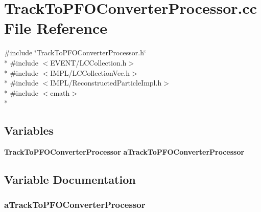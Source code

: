 \section{Track\-To\-P\-F\-O\-Converter\-Processor.\-cc File Reference}
\label{TrackToPFOConverterProcessor_8cc}
{\ttfamily \#include \char`\"{}Track\-To\-P\-F\-O\-Converter\-Processor.\-h\char`\"{}}\\*
{\ttfamily \#include $<$E\-V\-E\-N\-T/\-L\-C\-Collection.\-h$>$}\\*
{\ttfamily \#include $<$I\-M\-P\-L/\-L\-C\-Collection\-Vec.\-h$>$}\\*
{\ttfamily \#include $<$I\-M\-P\-L/\-Reconstructed\-Particle\-Impl.\-h$>$}\\*
{\ttfamily \#include $<$cmath$>$}\\*
\subsection*{Variables}
\begin{DoxyCompactItemize}
\item 
{\bf Track\-To\-P\-F\-O\-Converter\-Processor} {\bf a\-Track\-To\-P\-F\-O\-Converter\-Processor}
\end{DoxyCompactItemize}


\subsection{Variable Documentation}
\subsubsection[{a\-Track\-To\-P\-F\-O\-Converter\-Processor}]{ a\-Track\-To\-P\-F\-O\-Converter\-Processor}\label{TrackToPFOConverterProcessor_8cc_af0f5b841cb879fb54c57035f84df0197}
